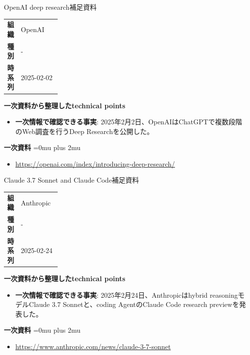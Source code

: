 \begin{technicalnote}{OpenAI deep research}{補足資料}
\begingroup
\begin{tabularx}{\linewidth}{@{}>{\bfseries}p{0.22\linewidth}X@{}}
組織 & OpenAI \\
種別 & - \\
時系列 & 2025-02-02 \\
\end{tabularx}
\smallskip
{\bfseries 一次資料から整理したtechnical points}
\begin{itemize}[leftmargin=1.5em,itemsep=0.35em]
\item \textbf{一次情報で確認できる事実}: 2025年2月2日、OpenAIはChatGPTで複数段階のWeb調査を行うDeep Researchを公開した。
\end{itemize}
\begin{samepage}
{\bfseries 一次資料}
\begingroup\sloppy
\Urlmuskip=0mu plus 2mu\relax
\begin{itemize}[leftmargin=1.5em,itemsep=0.25em]
\item {\scriptsize\url{https://openai.com/index/introducing-deep-research/}}
\end{itemize}
\endgroup
\end{samepage}
\endgroup
\end{technicalnote}
\medskip

\begin{technicalnote}{Claude 3.7 Sonnet and Claude Code}{補足資料}
\begingroup
\begin{tabularx}{\linewidth}{@{}>{\bfseries}p{0.22\linewidth}X@{}}
組織 & Anthropic \\
種別 & - \\
時系列 & 2025-02-24 \\
\end{tabularx}
\smallskip
{\bfseries 一次資料から整理したtechnical points}
\begin{itemize}[leftmargin=1.5em,itemsep=0.35em]
\item \textbf{一次情報で確認できる事実}: 2025年2月24日、Anthropicはhybrid reasoningモデルClaude 3.7 Sonnetと、coding AgentのClaude Code research previewを発表した。
\end{itemize}
\begin{samepage}
{\bfseries 一次資料}
\begingroup\sloppy
\Urlmuskip=0mu plus 2mu\relax
\begin{itemize}[leftmargin=1.5em,itemsep=0.25em]
\item {\scriptsize\url{https://www.anthropic.com/news/claude-3-7-sonnet}}
\end{itemize}
\endgroup
\end{samepage}
\endgroup
\end{technicalnote}
\medskip

